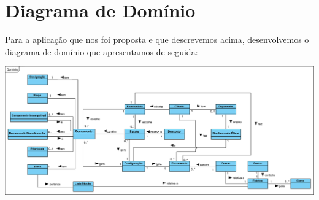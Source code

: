 \documentclass[11pt]{article} %
\begin{document}
\section{Diagrama de Domínio}
Para a aplicação que nos foi proposta e que descrevemos acima, desenvolvemos o diagrama de domínio que apresentamos de seguida:
\begin{center}
 \includegraphics[width = 6.5in]{Dominio.png}
\end{center}

\newpage
\end{document}
